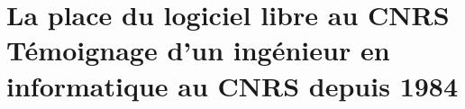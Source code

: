 \documentclass{FramateX}
\begin{document}
\chapter*{La place du logiciel libre au CNRS \\ {\small Témoignage d'un ingénieur en informatique au CNRS depuis 1984}} 
{}
\end{document}
